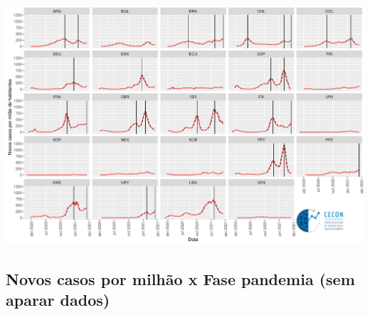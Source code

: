 \documentclass{SelfArx}
\begin{document}
\begin{center}
\includegraphics[width=.9\linewidth]{./figs/COVID/Picos.pdf}
\end{center}

\subsection*{Novos casos por milhão x Fase pandemia (sem aparar dados)}
\label{sec:org2a250f4}
\end{document}
